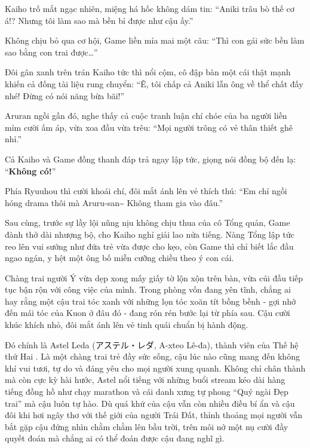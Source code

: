 \documentclass[../main.tex]{subfiles}
\begin{document}
Kaiho trố mắt ngạc nhiên, miệng há hốc không dám tin: ``Aniki trâu bò thế cơ á!? Nhưng tôi làm sao mà bền bỉ được như cậu ấy.''

Không chịu bỏ qua cơ hội, Game liền mỉa mai một câu: ``Thì con gái sức bền làm sao bằng con trai được\dots''

Đôi gân xanh trên trán Kaiho tức thì nổi cộm, cô đập bàn một cái thật mạnh khiến cả đống tài liệu rung chuyển: ``Ê, tôi chấp cả Aniki lẫn ông về thể chất đấy nhé! Đừng có nói năng bừa bãi!''

Aruran ngồi gần đó, nghe thấy cả cuộc tranh luận chí chóe của ba người liền mỉm cười ấm áp, vừa xoa đầu vừa trêu: ``Mọi người trông có vẻ thân thiết ghê nhỉ.''

Cả Kaiho và Game đồng thanh đáp trả ngay lập tức, giọng nói đồng bộ đến lạ: ``\textbf{Không có!}''

Phía Ryuuhou thì cười khoái chí, đôi mắt ánh lên vẻ thích thú: ``Em chỉ ngồi hóng drama thôi mà Aruru-san\~{} Không tham gia vào đâu.''

Sau cùng, trước sự lầy lội nũng nịu không chịu thua của cô Tổng quản, Game đành thở dài nhượng bộ, cho Kaiho nghỉ giải lao nửa tiếng. Nàng Tổng lập tức reo lên vui sướng như đứa trẻ vừa được cho kẹo, còn Game thì chỉ biết lắc đầu ngao ngán, y hệt một ông bố miễn cưỡng chiều theo ý con cái.

\ct

Chàng trai người Ý vừa dẹp xong mấy giấy tờ lộn xộn trên bàn, vừa cúi đầu tiếp tục bận rộn với công việc của mình. Trong phòng vốn đang yên tĩnh, chẳng ai hay rằng một cậu trai tóc xanh với những lọn tóc xoăn tít bồng bềnh - gợi nhớ đến mái tóc của Kuon ở đâu đó - đang rón rén bước lại từ phía sau. Cậu cười khúc khích nhỏ, đôi mắt ánh lên vẻ tinh quái chuẩn bị hành động.

\chrint

Đó chính là Astel Leda (アステル・レダ, A-xteo Lê-đa), thành viên của Thế hệ thứ Hai \hls. Là một chàng trai trẻ đầy sức sống, cậu lúc nào cũng mang đến không khí vui tươi, tự do và đáng yêu cho mọi người xung quanh. Không chỉ chân thành mà còn cực kỳ hài hước, Astel nổi tiếng với những buổi stream kéo dài hàng tiếng đồng hồ như chạy marathon và cái danh xưng tự phong ``Quý ngài Đẹp trai'' mà cậu luôn tự hào. Dù quá khứ của cậu vẫn còn nhiều điều bí ẩn và cậu đôi khi hơi ngây thơ với thế giới của người Trái Đất, thỉnh thoảng mọi người vẫn bắt gặp cậu đứng nhìn chằm chằm lên bầu trời, trên môi nở một nụ cười đầy quyết đoán mà chẳng ai có thể đoán được cậu đang nghĩ gì.
\end{document}
